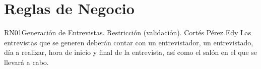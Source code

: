 \section{Reglas de Negocio}

\begin{BussinesRule}{RN01}{Generación de Entrevistas.} 
	\BRitem[Tipo:] Restricción (validación).
	\BRitem[Autor:] Cortés Pérez Edy
	\BRitem[Descripción:]	Las entrevistas que se generen deberán contar con un entrevistador, un entrevistado, día a realizar, hora de inicio y final de la entrevista, así como el salón en el que se llevará a cabo.
\end{BussinesRule}


